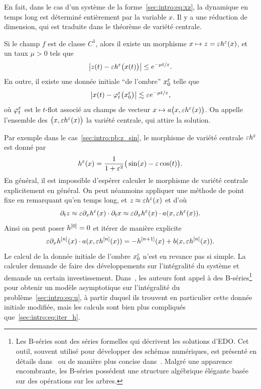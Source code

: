 En fait, dans le cas d'un système de la forme~\eqref{sec:intro:eq:xz}, la dynamique en temps long est déterminé entièrement par la variable $x$. Il y a une réduction de dimension, qui est traduite dans le théorème de variété centrale. 
\begin{FRtheorem*}
    Si le champ $f$ est de classe $C^1$, alors il existe un morphisme $x \mapsto z = \varepsilon h^{\varepsilon}(x)$, et un taux $\mu > 0$ tels que  
    \begin{equation*}
        \left| z(t) - \varepsilon h^{\varepsilon}\big( x(t) \big) \right|
        \leq e^{-\mu t/\varepsilon} .
    \end{equation*}
    En outre, il existe une donnée initiale \enquote{de l'ombre} $x_0^{\varepsilon}$ telle que 
    \begin{equation*}
        \big| x(t) - \varphi_t^{\varepsilon} \big( x_0^{\varepsilon} \big) \big| 
        \lesssim \varepsilon e^{-\mu t/\varepsilon} , 
    \end{equation*}
    où $\varphi^{\varepsilon}_t$ est le $t$-flot associé au champs de vecteur $x \mapsto a\big(x, \varepsilon h^{\varepsilon}(x) \big)$. On appelle l'ensemble des $\big( x, \varepsilon h^{\varepsilon}(x) \big)$ la variété centrale, qui attire la solution. 
\end{FRtheorem*}

Par exemple dans le cas~\eqref{sec:intro:pb:z_sin}, le morphisme de variété centrale $\varepsilon h^{\varepsilon}$ est donné par 
\begin{equation*}
    h^{\varepsilon}(x) 
    = \frac{1}{1 + \varepsilon^2} \big( \sin(x) - \varepsilon \cos(t) \big) .
\end{equation*}
En général, il est impossible d'espérer calculer le morphisme de variété centrale explicitement en général. On peut néanmoins appliquer une méthode de point fixe en remarquant qu'en temps long, et $z \approx \varepsilon h^{\varepsilon}(x)$ et d'où 
\begin{equation*}
    \partial_t z \approx \varepsilon \partial_x h^{\varepsilon}(x) \cdot \partial_t x
    \approx \varepsilon \partial_x h^{\varepsilon}(x) \cdot a(x, \varepsilon h^{\varepsilon}(x)) . 
\end{equation*} Ainsi on peut poser $h^{[0]} = 0$ et itérer de manière explicite
\begin{equation} \label{sec:intro:eq:iter_h}
    \varepsilon \partial_x h^{[n]}(x) \cdot a(x, \varepsilon h^{[n]} (x)) 
    = - h^{[n+1]}(x) + b(x, \varepsilon h^{[n]} (x)) .
\end{equation}
Le calcul de la donnée initiale de l'ombre $x^{\varepsilon}_0$ n'est en revance pas si simple. La calculer demande de faire des développements sur l'intégralité du système et demande un certain investissement. Dans~\cite{castella.2016.formal}, les auteurs font appel à des B-séries\footnote{
    Les B-séries sont des séries formelles qui décrivent les solutions d'EDO. Cet outil, souvent utilisé pour développer des schémas numériques, est présenté en détails dans~\cite[Chap.~III]{hairer.2006.geometric} ou de manière plus concise dans~\cite{chartier.2010.algebraic}. Malgré une apparence encombrante, les B-séries possédent une structure algébrique élégante basée sur des opérations sur les arbres.
} pour obtenir un modèle asymptotique sur l'intégralité du problème~\eqref{sec:intro:eq:u}, à partir duquel ils trouvent en particulier cette donnée initiale modifiée, mais les calculs sont bien plus compliqués que~\eqref{sec:intro:eq:iter_h}.

